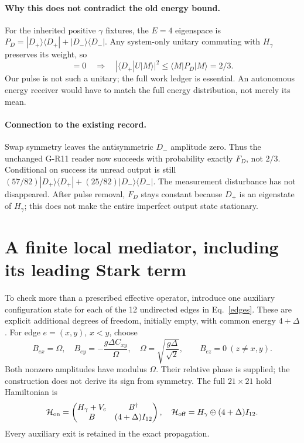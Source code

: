 \documentclass[11pt,a4paper]{article}
\newcommand{\ket}[1]{|#1\rangle}
\newcommand{\bra}[1]{\langle#1|}
\begin{document}
\paragraph{Why this does not contradict the old energy bound.}
For the inherited positive $\gamma$ fixtures, the $E=4$ eigenspace is
$P_D=\ket{D_+}\bra{D_+}+\ket{D_-}\bra{D_-}$. Any system-only unitary
commuting with $H_\gamma$ preserves its weight, so
\begin{equation}
 [U,H_\gamma]=0\quad\Longrightarrow\quad
 |\bra{D_+}U\ket M|^2\le\bra M P_D\ket M=2/3.
\end{equation}
Our pulse is not such a unitary; the full work ledger is essential.
An autonomous energy receiver would have to match the full energy
distribution, not merely its mean.

\paragraph{Connection to the existing record.}
Swap symmetry leaves the antisymmetric $D_-$ amplitude zero. Thus the
unchanged G-R11 reader now succeeds with probability exactly $F_D$,
not $2/3$. Conditional on success its unread output is still
$(57/82)\ket{D_+}\bra{D_+}+(25/82)\ket{D_-}\bra{D_-}$.
The measurement disturbance has not disappeared. After pulse removal,
$F_D$ stays constant because $D_+$ is an eigenstate of $H_\gamma$;
this does not make the entire imperfect output state stationary.

\newpage
\section{A finite local mediator, including its leading Stark term}
To check more than a prescribed effective operator, introduce one
auxiliary configuration state for each of the 12 undirected edges in
Eq.~\eqref{edges}. These are explicit additional degrees of freedom,
initially empty, with common energy $4+\Delta$. For edge $e=(x,y)$,
$x<y$, choose
\begin{equation}
 B_{ex}=\Omega,\quad B_{ey}=-\frac{g\Delta C_{xy}}{\Omega},\quad
 \Omega=\sqrt{\frac{g\Delta}{\sqrt2}},\qquad B_{ez}=0\ (z\ne x,y).
\end{equation}
Both nonzero amplitudes have modulus $\Omega$. Their relative phase
is supplied; the construction does not derive its sign from symmetry.
The full $21\times21$ hold Hamiltonian is
\begin{equation}
 \mathcal H_{\rm on}=
 \begin{pmatrix}H_\gamma+V_c&B^\dagger\\B&(4+\Delta)I_{12}\end{pmatrix},
 \quad
 \mathcal H_{\rm off}=H_\gamma\oplus(4+\Delta)I_{12}.\label{relay}
\end{equation}
Every auxiliary exit is retained in the exact propagation.
\end{document}
